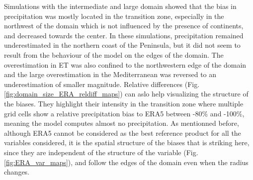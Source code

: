 Simulations with the intermediate and large domain showed that the bias in precipitation was mostly located in the transition zone, especially in the northwest of the domain which is not influenced by the presence of continents, and decreased towards the center. In these simulations, precipitation remained underestimated in the northern coast of the Peninsula, but it did not seem to result from the behaviour of the model on the edges of the domain.
The overestimation in ET was also confined to the northwestern edge of the domain and the large overestimation in the Mediterranean was reversed to an underestimation of smaller magnitude. Relative differences (Fig. \ref{fig:domain_size_ERA_reldiff_maps}) can aslo help visualizing the structure of the biases. They highlight their intensity in the transition zone where multiple grid cells show a relative precipitation bias to ERA5 between -80\% and -100\%, meaning the model computes almost no precipitation. 
As mentionned before, although ERA5 cannot be considered as the best reference product for all the variables considered, it is the spatial structure of the biases that is striking here, since they are independent of the structure of the variable (Fig. \ref{fig:ERA_var_maps}), and follow the edges of the domain even when the radius changes.

